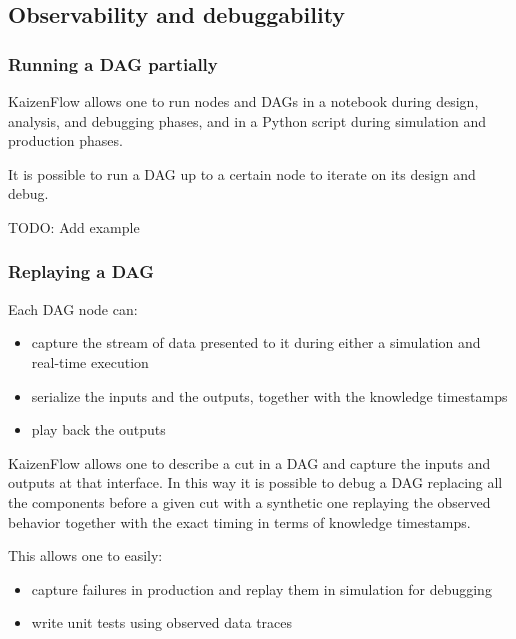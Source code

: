 \documentclass[11pt, reqno]{amsart}
\theoremstyle{definition}
\theoremstyle{remark}
\begin{document}
\subsection{Observability and debuggability}

\subsubsection{Running a DAG partially}
KaizenFlow allows one to run nodes and DAGs in a notebook during design, analysis,
and debugging phases, and in a Python script during simulation and production
phases.

It is possible to run a DAG up to a certain node to iterate on its design and debug.

TODO: Add example

\subsubsection{Replaying a DAG}

Each DAG node can:

\begin{itemize}
  \item capture the stream of data presented to it during either a simulation
        and real-time execution
  \item serialize the inputs and the outputs, together with the knowledge
        timestamps
  \item play back the outputs
\end{itemize}

KaizenFlow allows one to describe a cut in a DAG and capture the inputs and
outputs at that interface. In this way it is possible to debug a DAG
replacing all the components before a given cut with a synthetic one
replaying the observed behavior together with the exact timing in terms
of knowledge timestamps.

This allows one to easily:

\begin{itemize}
  \item capture failures in production and replay them in simulation for
        debugging
  \item write unit tests using observed data traces
\end{itemize}
\end{document}
